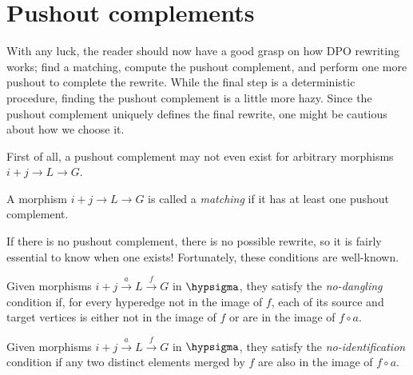 \section{Pushout complements}

With any luck, the reader should now have a good grasp on how DPO rewriting
works; find a matching, compute the pushout complement, and perform one more
pushout to complete the rewrite.
While the final step is a deterministic procedure, finding the pushout
complement is a little more hazy.
Since the pushout complement uniquely defines the final rewrite, one might be
cautious about how we choose it.

First of all, a pushout complement may not even exist for arbitrary morphisms
\(i+j \to L \to G\).

\begin{definition}
    A morphism \(i+j \to L \to G\) is called a \emph{matching} if it
    has at least one pushout complement.
\end{definition}

If there is no pushout complement, there is no possible rewrite, so it is fairly
essential to know when one exists!
Fortunately, these conditions are well-known.

\begin{definition}
    Given morphisms \(i+j \xrightarrow{a} L \xrightarrow{f} G\) in
    \(\hypsigma\), they satisfy the \emph{no-dangling} condition if, for every
    hyperedge not in
    the image of \(f\), each of its source and target vertices is either not in
    the image of \(f\) or are in the image of \(f \circ a\).
\end{definition}

\begin{example}
\end{example}

\begin{definition}
    Given morphisms \(i+j \xrightarrow{a} L \xrightarrow{f} G\) in
    \(\hypsigma\), they satisfy the \emph{no-identification} condition if any
    two distinct elements merged by \(f\) are also in the image of \(f \circ a\).
\end{definition}

\begin{example}
\end{example}

